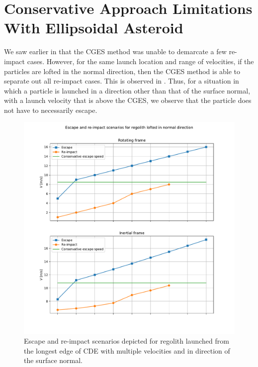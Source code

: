 \section{Conservative Approach Limitations With Ellipsoidal Asteroid}
\label{sec:conservative_escape_cde_limitations}
We saw earlier in  that the \gls{CGES} method was unable to demarcate a few re-impact cases. However, for the same launch location and range of velocities, if the particles are lofted in the normal direction, then the \gls{CGES} method is able to separate out all re-impact cases. This is observed in . Thus, for a situation in which a particle is launched in a direction other than that of the surface normal, with a launch velocity that is above the \gls{CGES}, we observe that the particle does not have to necessarily escape.
\begin{figure}[htb]
\centering
\captionsetup{justification=centering}
\includegraphics[width=\textwidth, height=0.5\textheight, keepaspectratio=true]{non_conservative_escape_speed/conservative_escape_normal_direction.pdf}
\caption{Escape and re-impact scenarios depicted for regolith launched from the longest edge of \gls{CDE} with multiple velocities and in direction of the surface normal.}
\label{fig:conservative_escape_normal_direction}
\end{figure}
